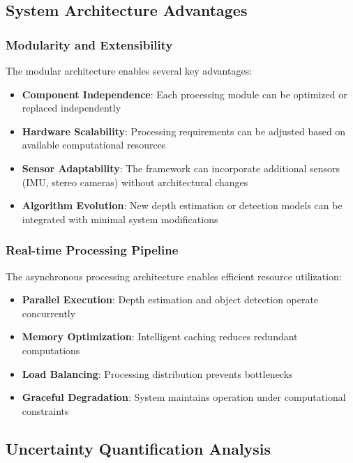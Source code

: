 \documentclass[12pt,oneside]{book}
\begin{document}
\subsection{System Architecture Advantages}

\subsubsection{Modularity and Extensibility}

The modular architecture enables several key advantages:

\begin{itemize}
\item \textbf{Component Independence}: Each processing module can be optimized or replaced independently
\item \textbf{Hardware Scalability}: Processing requirements can be adjusted based on available computational resources
\item \textbf{Sensor Adaptability}: The framework can incorporate additional sensors (IMU, stereo cameras) without architectural changes
\item \textbf{Algorithm Evolution}: New depth estimation or detection models can be integrated with minimal system modifications
\end{itemize}

\subsubsection{Real-time Processing Pipeline}

The asynchronous processing architecture enables efficient resource utilization:

\begin{itemize}
\item \textbf{Parallel Execution}: Depth estimation and object detection operate concurrently
\item \textbf{Memory Optimization}: Intelligent caching reduces redundant computations
\item \textbf{Load Balancing}: Processing distribution prevents bottlenecks
\item \textbf{Graceful Degradation}: System maintains operation under computational constraints
\end{itemize}

\subsection{Uncertainty Quantification Analysis}
\end{document}
